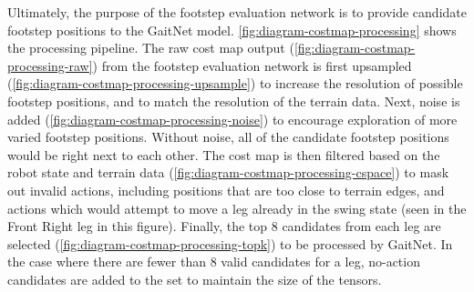 Ultimately, the purpose of the footstep evaluation network is to
provide candidate footstep positions to the GaitNet model.
\autoref{fig:diagram-costmap-processing} shows the processing pipeline.
The raw cost map output (\autoref{fig:diagram-costmap-processing-raw})
from the footstep evaluation network is first upsampled
(\autoref{fig:diagram-costmap-processing-upsample}) to increase the
resolution of possible footstep positions, and to match the resolution of
the terrain data. Next, noise is added
(\autoref{fig:diagram-costmap-processing-noise}) to
encourage exploration of more varied footstep positions. Without noise,
all of the candidate footstep positions would be right next to each other.
The cost map is then filtered based on the robot state and terrain data
(\autoref{fig:diagram-costmap-processing-cspace}) to mask out
invalid actions, including positions that are too close to terrain edges,
and actions which would attempt to move a leg already in the swing state
(seen in the Front Right leg in this figure). Finally, the top 8
candidates from each leg are selected
(\autoref{fig:diagram-costmap-processing-topk})
to be processed by GaitNet. In the case where there are fewer than 8 valid
candidates for a leg, no-action candidates are added to the set to maintain
the size of the tensors.

\def\imgwidth{0.16\textwidth}
\def\xgap{2em}          %
\def\arrowwidth{1.2em}  %
\def\arrowshift{0.5em} %

